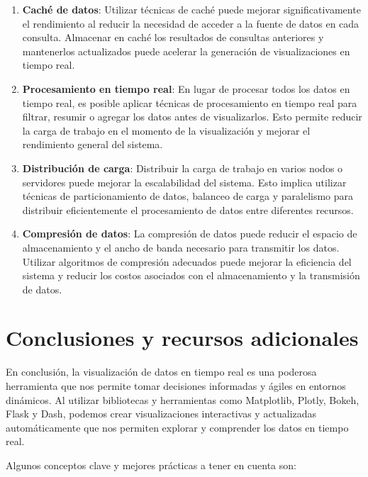 \documentclass[
  a4paper,
]{article}
\begin{document}
\begin{enumerate}
\def\labelenumi{\arabic{enumi}.}
\item
  \textbf{Caché de datos}: Utilizar técnicas de caché puede mejorar
  significativamente el rendimiento al reducir la necesidad de acceder a
  la fuente de datos en cada consulta. Almacenar en caché los resultados
  de consultas anteriores y mantenerlos actualizados puede acelerar la
  generación de visualizaciones en tiempo real.
\item
  \textbf{Procesamiento en tiempo real}: En lugar de procesar todos los
  datos en tiempo real, es posible aplicar técnicas de procesamiento en
  tiempo real para filtrar, resumir o agregar los datos antes de
  visualizarlos. Esto permite reducir la carga de trabajo en el momento
  de la visualización y mejorar el rendimiento general del sistema.
\item
  \textbf{Distribución de carga}: Distribuir la carga de trabajo en
  varios nodos o servidores puede mejorar la escalabilidad del sistema.
  Esto implica utilizar técnicas de particionamiento de datos, balanceo
  de carga y paralelismo para distribuir eficientemente el procesamiento
  de datos entre diferentes recursos.
\item
  \textbf{Compresión de datos}: La compresión de datos puede reducir el
  espacio de almacenamiento y el ancho de banda necesario para
  transmitir los datos. Utilizar algoritmos de compresión adecuados
  puede mejorar la eficiencia del sistema y reducir los costos asociados
  con el almacenamiento y la transmisión de datos.
\end{enumerate}

\hypertarget{conclusiones-y-recursos-adicionales}{%
\section{Conclusiones y recursos
adicionales}\label{conclusiones-y-recursos-adicionales}}

En conclusión, la visualización de datos en tiempo real es una poderosa
herramienta que nos permite tomar decisiones informadas y ágiles en
entornos dinámicos. Al utilizar bibliotecas y herramientas como
Matplotlib, Plotly, Bokeh, Flask y Dash, podemos crear visualizaciones
interactivas y actualizadas automáticamente que nos permiten explorar y
comprender los datos en tiempo real.

Algunos conceptos clave y mejores prácticas a tener en cuenta son:
\end{document}

